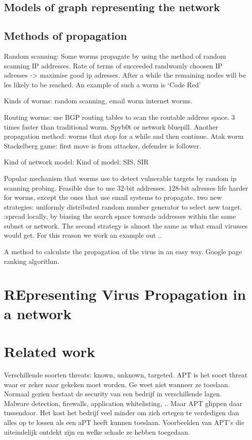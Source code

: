 \subsection{Models of graph representing the network}

\subsection*{Methods of propagation}

\begin{description}
\item Random scanning: Some worms propagate by using the method of random scanning 
IP addresses.  Rate of terms of succeeded randwomly choosen IP adresses -> maximise good ip adresses. After a while the remaining nodes will be les likely to be reached. An example of such a worm is `Code Red' 
\end{description}
Kinds of worms: random scanning, email worm internet worms. 

Routing worms: use BGP routing tables to scan the routable address space. 3 times faster than traditional worm. Spyb0t or network bluepill.
Another propagation method: worms that stop for a while and then continue. Atak worm
Stackelberg game: first move is from attacker, defender is follower. 

Kind of network model: 
Kind of model: SIS, SIR

Popular mechanism that worms use to detect vulnerable targets by random ip scanning probing. Feasible due to use 32-bit addresses. 128-bit adresses life harder for worms, except the ones that use email systems to propagate. two new strategies: uniformly distributed random number generator to select new target. :spread locally, by biasing the search space towards addresses within the same subnet or network. 
The second strategy is almost the same as what email virusses would get. For this reason we work an example out .. 



A method to calculate the propagation of the virus in an easy way. Google page ranking algorithm. 

\section{REpresenting Virus Propagation in a network}
\section{Related work}
Verschillende soorten threats: known, unknown, targeted.
APT is het soort threat waar er zeker naar gekeken moet worden. Ge weet niet wanneer ze toeslaan. Normaal gezien bestaat de security van een bedrijf in verschillende lagen. Malware detection, firewalls, application whitelisting, .. Maar APT glippen daar tussendoor. Het kost het bedrijf veel minder om zich ertegen te verdedigen dan alles op te lossen als een aPT heeft kunnen toeslaan. 
Voorbeelden van APT's die uiteindelijk ontdekt zijn en welke schade ze hebben toegedaan. 

